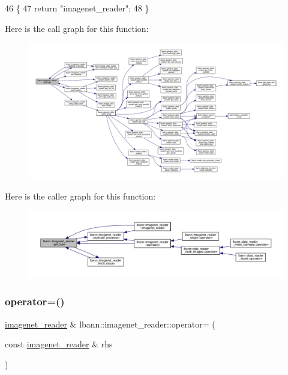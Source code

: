 \begin{DoxyCode}
46                                       \{
47     \textcolor{keywordflow}{return} \textcolor{stringliteral}{"imagenet\_reader"};
48   \}
\end{DoxyCode}
Here is the call graph for this function\+:\nopagebreak
\begin{figure}[H]
\begin{center}
\leavevmode
\includegraphics[width=350pt]{classlbann_1_1imagenet__reader_a0afea0db8b4286b56211842f8f1d7678_cgraph}
\end{center}
\end{figure}
Here is the caller graph for this function\+:\nopagebreak
\begin{figure}[H]
\begin{center}
\leavevmode
\includegraphics[width=350pt]{classlbann_1_1imagenet__reader_a0afea0db8b4286b56211842f8f1d7678_icgraph}
\end{center}
\end{figure}
\mbox{\label{classlbann_1_1imagenet__reader_a5ea15cc16aa679a2cb549b44eb77f323}} 
\subsubsection{\texorpdfstring{operator=()}{operator=()}}
{\footnotesize\ttfamily \hyperlink{classlbann_1_1imagenet__reader}{imagenet\+\_\+reader} \& lbann\+::imagenet\+\_\+reader\+::operator= (\begin{DoxyParamCaption}\item[{const \hyperlink{classlbann_1_1imagenet__reader}{imagenet\+\_\+reader} \&}]{rhs }\end{DoxyParamCaption})}



